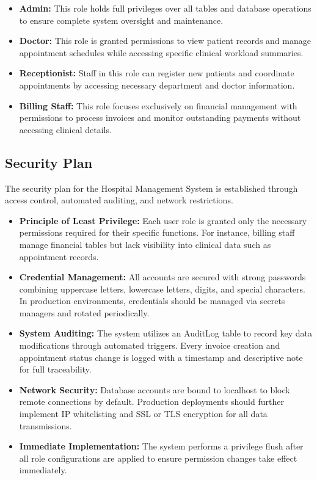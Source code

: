\begin{itemize}
    \item \textbf{Admin:} This role holds full privileges over all tables and database operations to ensure complete system oversight and maintenance.
    \item \textbf{Doctor:} This role is granted permissions to view patient records and manage appointment schedules while accessing specific clinical workload summaries.
    \item \textbf{Receptionist:} Staff in this role can register new patients and coordinate appointments by accessing necessary department and doctor information.
    \item \textbf{Billing Staff:} This role focuses exclusively on financial management with permissions to process invoices and monitor outstanding payments without accessing clinical details.
\end{itemize}

\subsection{Security Plan}
The security plan for the Hospital Management System is established through access control, automated auditing, and network restrictions.

\begin{itemize}
    \item \textbf{Principle of Least Privilege:} Each user role is granted only the necessary permissions required for their specific functions. For instance, billing staff manage financial tables but lack visibility into clinical data such as appointment records.
    \item \textbf{Credential Management:} All accounts are secured with strong passwords combining uppercase letters, lowercase letters, digits, and special characters. In production environments, credentials should be managed via secrets managers and rotated periodically.
    \item \textbf{System Auditing:} The system utilizes an AuditLog table to record key data modifications through automated triggers. Every invoice creation and appointment status change is logged with a timestamp and descriptive note for full traceability.
    \item \textbf{Network Security:} Database accounts are bound to localhost to block remote connections by default. Production deployments should further implement IP whitelisting and SSL or TLS encryption for all data transmissions.
    \item \textbf{Immediate Implementation:} The system performs a privilege flush after all role configurations are applied to ensure permission changes take effect immediately.
\end{itemize}

